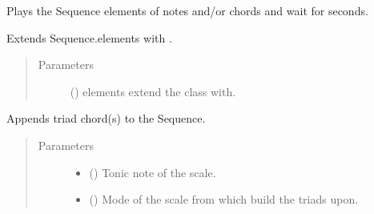 \documentclass[letterpaper,10pt,english]{sphinxmanual}
\begin{document}
\begin{fulllineitems}
\begin{fulllineitems}
\end{fulllineitems}


\begin{fulllineitems}
\label{\detokenize{birdears:birdears.sequence.Sequence.async_play}}
Plays the Sequence elements of notes and/or chords and wait for
 seconds.

\end{fulllineitems}


\begin{fulllineitems}
\label{\detokenize{birdears:birdears.sequence.Sequence.extend}}
Extends Sequence.elements with .
\begin{quote}\begin{description}
\item[{Parameters}] \leavevmode
{} () \textendash{} elements extend the class with.

\end{description}\end{quote}

\end{fulllineitems}


\begin{fulllineitems}
\label{\detokenize{birdears:birdears.sequence.Sequence.make_chord_progression}}
Appends triad chord(s) to the Sequence.
\begin{quote}\begin{description}
\item[{Parameters}] \leavevmode\begin{itemize}
\item {} 
 () \textendash{} Tonic note of the scale.

\item {} 
 () \textendash{} Mode of the scale from which build the triads upon.


\end{itemize}
\end{description}
\end{quote}
\end{fulllineitems}
\end{fulllineitems}
\end{document}
